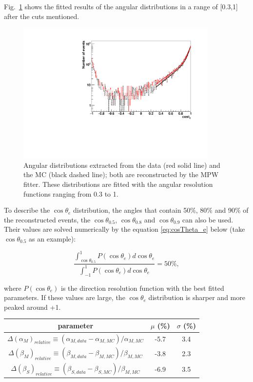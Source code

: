 Fig.~\ref{angularResolMPW} shows the fitted results of the angular distributions in a range of [0.3,1] after the cuts mentioned.
\begin{figure}
	\centering
	\includegraphics[width=10cm]{16NangularResol.pdf}
	\caption{Angular distributions extracted from the data (red solid line) and the MC (black dashed line); both are reconstructed by the MPW fitter. These distributions are fitted with the angular resolution functions ranging from 0.3 to 1.}
	\label{angularResolMPW}
\end{figure}

To describe the $\cos\theta_e$ distribution, the angles that contain 50\%, 80\%
and 90\% of the reconstructed events, the $\cos\theta_{0.5}$, $\cos\theta_{0.8}$ and $\cos\theta_{0.9}$ can also be used. Their values are solved numerically by the equation \ref{eq:cosTheta_e} below (take $\cos\theta_{0.5}$ as an example):

\begin{equation}\label{eq:cosTheta_e}
\frac{\int_{\cos\theta_{0.5}}^1 P(\cos\theta_e) d\cos\theta_e}{\int_{-1}^1 P(\cos\theta_e) d\cos\theta_e} = 50\%,
\end{equation}

where $P(\cos\theta_e)$ is the direction resolution function with the best fitted parameters. If these values are large, the $\cos\theta_e$ distribution is sharper and more peaked around +1.

\begin{table}[ht]
	\centering
	\begin{tabular}{ccc}%
		\toprule
		 parameter & $\mu$ (\%)& $\sigma$ (\%)\\
		\hline
	$\Delta(\alpha_M)_{relative}\equiv (\alpha_{M,data}-\alpha_{M,MC})/\alpha_{M,MC}$ & -5.7 &3.4\\
$\Delta(\beta_M)_{relative}\equiv (\beta_{M,data}-\beta_{M,MC})/\beta_{M,MC}$ 	&-3.8 & 2.3\\
$\Delta(\beta_S)_{relative}\equiv (\beta_{S,data}-\beta_{S,MC})/\beta_{M,MC}$ 	&-6.9 &3.5\\		
		\bottomrule
	\end{tabular}
	\label{angularSystem}
\end{table}

